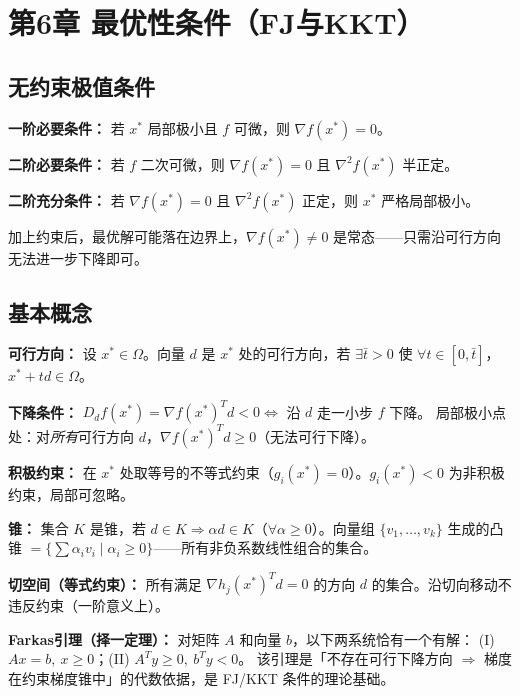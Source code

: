 \section{第6章 \quad 最优性条件（FJ与KKT）}

\subsection{无约束极值条件}

\textbf{一阶必要条件：} 若 $x^*$ 局部极小且 $f$ 可微，则 $\nabla f(x^*) = 0$。

\textbf{二阶必要条件：} 若 $f$ 二次可微，则 $\nabla f(x^*)=0$ 且 $\nabla^2 f(x^*)$ 半正定。

\textbf{二阶充分条件：} 若 $\nabla f(x^*)=0$ 且 $\nabla^2 f(x^*)$ 正定，则 $x^*$ 严格局部极小。

加上约束后，最优解可能落在边界上，$\nabla f(x^*)\neq 0$ 是常态——只需沿可行方向无法进一步下降即可。

\subsection{基本概念}

\textbf{可行方向：} 设 $x^*\in\Omega$。向量 $d$ 是 $x^*$ 处的可行方向，若 $\exists\bar{t}>0$ 使 $\forall t\in[0,\bar{t}]$，$x^*+td\in\Omega$。

\textbf{下降条件：} $D_d f(x^*)=\nabla f(x^*)^T d < 0 \Longleftrightarrow$ 沿 $d$ 走一小步 $f$ 下降。
局部极小点处：对\emph{所有}可行方向 $d$，$\nabla f(x^*)^T d \ge 0$（无法可行下降）。

\textbf{积极约束：} 在 $x^*$ 处取等号的不等式约束（$g_i(x^*)=0$）。$g_i(x^*)<0$ 为非积极约束，局部可忽略。

\textbf{锥：} 集合 $K$ 是锥，若 $d\in K \Rightarrow \alpha d\in K$（$\forall\alpha\ge0$）。向量组 $\{v_1,\dots,v_k\}$ 生成的凸锥 $=\{\sum\alpha_i v_i \mid \alpha_i\ge 0\}$——所有非负系数线性组合的集合。

\textbf{切空间（等式约束）：} 所有满足 $\nabla h_j(x^*)^T d = 0$ 的方向 $d$ 的集合。沿切向移动不违反约束（一阶意义上）。

\textbf{Farkas引理（择一定理）：}
对矩阵 $A$ 和向量 $b$，以下两系统恰有一个有解：
(I) $Ax=b,\ x\ge 0$；\quad (II) $A^T y \ge 0,\ b^T y < 0$。
该引理是「不存在可行下降方向 $\Rightarrow$ 梯度在约束梯度锥中」的代数依据，是 FJ/KKT 条件的理论基础。

